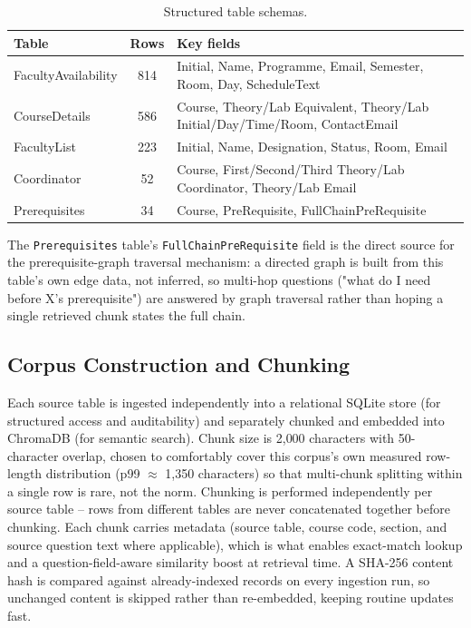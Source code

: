 \documentclass[a4paper,twoside]{article}
\begin{document}
\begin{table}[h]
\caption{Structured table schemas.}\label{tab:structured-schemas}\centering
\begin{tabular}{|l|c|p{4.2cm}|}
\hline
Table & Rows & Key fields \\
\hline
FacultyAvailability & 814 & Initial, Name, Programme, Email, Semester, Room, Day, ScheduleText \\
CourseDetails & 586 & Course, Theory/Lab Equivalent, Theory/Lab Initial/Day/Time/Room, ContactEmail \\
FacultyList & 223 & Initial, Name, Designation, Status, Room, Email \\
Coordinator & 52 & Course, First/Second/Third Theory/Lab Coordinator, Theory/Lab Email \\
Prerequisites & 34 & Course, PreRequisite, FullChainPreRequisite \\
\hline
\end{tabular}
\end{table}

The \texttt{Prerequisites} table's \texttt{FullChainPreRequisite} field is the direct source for the prerequisite-graph traversal mechanism: a directed graph is built from this table's own edge data, not inferred, so multi-hop questions ("what do I need before X's prerequisite") are answered by graph traversal rather than hoping a single retrieved chunk states the full chain.

\subsection{Corpus Construction and Chunking}
\label{subsec:corpus-construction}

Each source table is ingested independently into a relational SQLite store (for structured access and auditability) and separately chunked and embedded into ChromaDB (for semantic search). Chunk size is 2{,}000 characters with 50-character overlap, chosen to comfortably cover this corpus's own measured row-length distribution (p99 $\approx$ 1{,}350 characters) so that multi-chunk splitting within a single row is rare, not the norm. Chunking is performed independently per source table -- rows from different tables are never concatenated together before chunking. Each chunk carries metadata (source table, course code, section, and source question text where applicable), which is what enables exact-match lookup and a question-field-aware similarity boost at retrieval time. A SHA-256 content hash is compared against already-indexed records on every ingestion run, so unchanged content is skipped rather than re-embedded, keeping routine updates fast.
\end{document}
